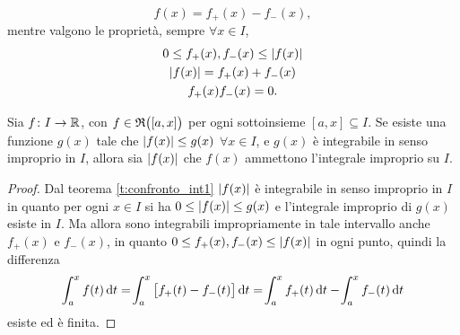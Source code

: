 \[
f(x)=f_+(x)-f_-(x),
\]
mentre valgono le proprietà, sempre $\forall x\in I$,
\[\begin{gathered}
0\leq f_+(x),f_-(x)\leq\left|{f(x)}\right|\\
\left|{f(x)}\right|=f_+(x)+f_-(x)\\
f_+(x)f_-(x)=0.
\end{gathered}\]
\begin{teorema} \label{t:confronto_int2}
Sia $f\colon I\to\mathbb{R}$, con $f\in\mathfrak{R}\big([a,x]\big)$ per ogni sottoinsieme $[a,x]\subseteq I$.
Se esiste una funzione $g(x)$ tale che $\left|{f(x)}\right|\leq g(x)$ $\forall x\in I$, e $g(x)$ è integrabile in senso improprio in $I$, allora sia $\left|{f(x)}\right|$ che $f(x)$ ammettono l'integrale improprio su $I$.
\end{teorema}
\begin{proof}
Dal teorema \ref{t:confronto_int1} $\left|{f(x)}\right|$ è integrabile in senso improprio in $I$ in quanto per ogni $x\in I$ si ha $0\leq\left|{f(x)}\right|\leq g(x)$ e l'integrale improprio di $g(x)$ esiste in $I$.
Ma allora sono integrabili impropriamente in tale intervallo anche $f_+(x)$ e $f_-(x)$, in quanto $0\leq f_+(x),f_-(x)\leq\left|{f(x)}\right|$ in ogni punto, quindi la differenza
\[
\int_a^xf(t)\,\textup{d} t=\!\int_a^x\big[f_+(t)-f_-(t)\big]\,\textup{d} t=\!\int_a^xf_+(t)\,\textup{d} t-\!\int_a^xf_-(t)\,\textup{d} t
\]
esiste ed è finita.
\end{proof}

